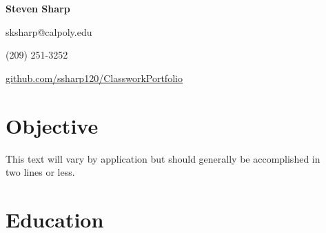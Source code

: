 \documentclass{article}[11pt]
\begin{document}
\begin{center}
{\fontsize{1cm}{1cm}\textbf{Steven Sharp}}

sksharp@calpoly.edu\qquad
\begin{small}(209) 251-3252\end{small}

\href{https://github.com/ssharp120/ClassworkPortfolio}{github.com/ssharp120/ClassworkPortfolio}

\end{center}

\section*{Objective}

This text will vary by application but should generally be accomplished in\\two lines or less.

\section*{Education}
\end{document}
